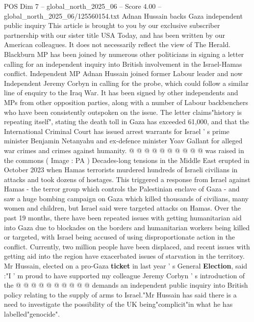 \begin{textsample}{POS Dim 7 – global\_north\_2025\_06 – Score 4.00 – global\_north\_2025\_06/125560154.txt}  \label{ex:f7_pos_384}
Adnan Hussain backs Gaza independent public inquiry This article is brought to you by our exclusive subscriber partnership with our sister title USA Today, and has been written by our American colleagues.
It does not necessarily reflect the view of The Herald.
Blackburn MP has been joined by numerous other politicians in signing a letter calling for an independent inquiry into British involvement in the Israel-Hamas conflict.
Independent MP Adnan Hussain joined former Labour leader and now Independent Jeremy Corbyn in calling for the probe, which could follow a similar line of enquiry to the Iraq War.
It has been signed by other independents and MPs from other opposition parties, along with a number of Labour backbenchers who have been consistently outspoken on the issue.
The letter claims"history is repeating itself", stating the death toll in Gaza has exceeded 61,000, and that the International Criminal Court has issued arrest warrants for Israel ' s prime minister Benjamin Netanyahu and ex-defence minister Yoav Gallant for alleged war crimes and crimes against humanity. @ @ @ @ @ @ @ @ @ @ was raised in the commons ( Image : PA ) Decades-long tensions in the Middle East erupted in October 2023 when Hamas terrorists murdered hundreds of Israeli civilians in attacks and took dozens of hostages.
This triggered a response from Israel against Hamas - the terror group which controls the Palestinian enclave of Gaza - and saw a huge bombing campaign on Gaza which killed thousands of civilians, many women and children, but Israel said were targeted attacks on Hamas.
Over the past 19 months, there have been repeated issues with getting humanitarian aid into Gaza due to blockades on the borders and humanitarian workers being killed or targeted, with Israel being accused of using disproportionate action in the conflict.
Currently, two million people have been displaced, and recent issues with getting aid into the region have exacerbated issues of starvation in the territory.
Mr Hussain, elected on a pro-Gaza \textbf{ticket} in last year ' s General \textbf{Election}, said :"I ' m proud to have supported my colleague Jeremy Corbyn ' s introduction of the @ @ @ @ @ @ @ @ @ @ demands an independent public inquiry into British policy relating to the supply of arms to Israel."Mr Hussain has said there is a need to investigate the possibility of the UK being"complicit"in what he has labelled"genocide".

\end{textsample}
